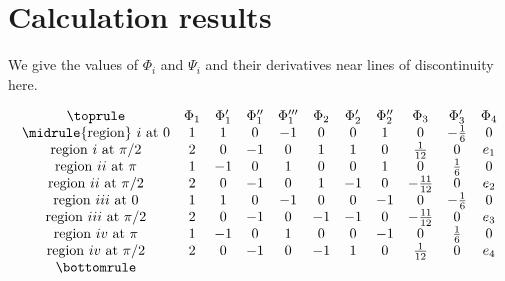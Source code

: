 \documentclass{article}
\def \Rone{\uppercase\expandafter{\romannumeral1}}
\def \Rtwo{\uppercase\expandafter{\romannumeral2}}
\def \Rthree{\uppercase\expandafter{\romannumeral3}}
\def \Rfour{\uppercase\expandafter{\romannumeral4}}
\numberwithin{figure}{section}
\numberwithin{equation}{section}
\theoremstyle{remark}
\theoremstyle{definition}
\begin{document}
\section{Calculation results}\label{important values}
We give the values of $\Phi_i$ and $\Psi_i$ and their derivatives near lines of discontinuity here.
   \begin{table}[H]
\setlength{\arraycolsep}{4pt}
   \[\begin{array}{ccccccccccc}\toprule
	&	\Phi_1 & \Phi_1' &\Phi_1'' &\Phi_1''' &\Phi_2&\Phi_2'&\Phi_2''&\Phi_3&\Phi_3'&\Phi_4\\ \midrule
	{\rm region}\ \Rone\ {\rm at}\ 0&1 & 1 & 0 & -1 & 0&0&1&0&-\frac{1}{6}&0\\ 
	{\rm region}\ \Rone\ {\rm at}\ \pi/2&2 & 0 & -1 & 0 & 1&1&0&\frac{1}{12}&0&e_1\\
	{\rm region}\ \Rtwo\ {\rm at}\ \pi&1 & -1 & 0 & 1 & 0&0&1&0&\frac{1}{6}&0\\
	{\rm region}\ \Rtwo\ {\rm at}\ \pi/2&2 & 0 & -1 & 0& 1&-1&0&-\frac{11}{12}&0&e_2\\
	{\rm region}\ \Rthree\ {\rm at}\ 0&1 & 1 & 0 & -1 & 0&0&-1&0&-\frac{1}{6}&0\\ 
	{\rm region}\ \Rthree\ {\rm at}\ \pi/2&2 & 0 & -1 & 0 & -1&-1&0&-\frac{11}{12}&0&e_3\\ 
	{\rm region}\ \Rfour\ {\rm at}\ \pi& 1 & -1 & 0 & 1 & 0&0&-1&0&\frac{1}{6}&0\\ 
	{\rm region}\ \Rfour\ {\rm at}\ \pi/2& 2 & 0 & -1 & 0 & -1 &1&0&\frac{1}{12}&0&e_4\\ \bottomrule
\end{array}\]
\caption{values of $\Phi_i$ and their derivatives near discontinuity lines} 
\label{values of Phi}
\end{table}
\end{document}
